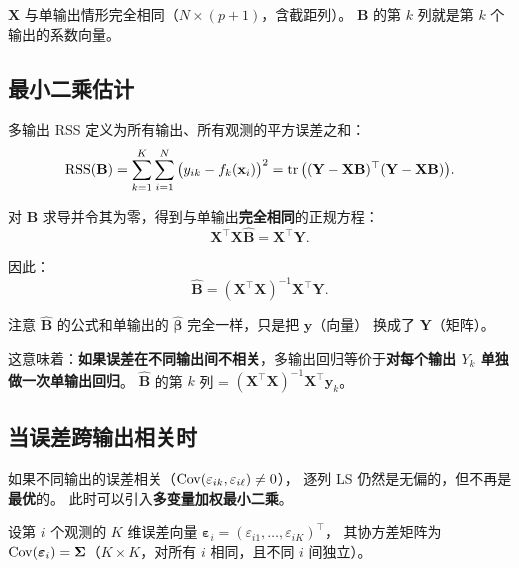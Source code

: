 $\mathbf{X}$ 与单输出情形完全相同（$N \times (p+1)$，含截距列）。
$\mathbf{B}$ 的第 $k$ 列就是第 $k$ 个输出的系数向量。

\subsection{最小二乘估计}

多输出 RSS 定义为所有输出、所有观测的平方误差之和：
\begin{equation}\label{eq:multi_RSS}
    \mathrm{RSS}(\mathbf{B})
    = \sum_{k=1}^{K} \sum_{i=1}^{N} \big(y_{ik} - f_k(\mathbf{x}_i)\big)^2
    = \operatorname{tr}\big((\mathbf{Y} - \mathbf{X}\mathbf{B})^\top (\mathbf{Y} - \mathbf{X}\mathbf{B})\big).
\end{equation}

对 $\mathbf{B}$ 求导并令其为零，得到与单输出\textbf{完全相同}的正规方程：
\begin{equation}\label{eq:multi_normal}
    \mathbf{X}^\top \mathbf{X} \hat{\mathbf{B}} = \mathbf{X}^\top \mathbf{Y}.
\end{equation}

因此：
\begin{equation}\label{eq:multi_B_hat}
    \boxed{\hat{\mathbf{B}} = (\mathbf{X}^\top \mathbf{X})^{-1} \mathbf{X}^\top \mathbf{Y}}.
\end{equation}

\begin{remark}
注意 $\hat{\mathbf{B}}$ 的公式和单输出的 $\hat{\bm{\beta}}$ 完全一样，只是把 $\mathbf{y}$（向量）
换成了 $\mathbf{Y}$（矩阵）。

这意味着：\textbf{如果误差在不同输出间不相关}，多输出回归等价于\textbf{对每个输出 $Y_k$ 单独做一次单输出回归}。
$\hat{\mathbf{B}}$ 的第 $k$ 列 = $(\mathbf{X}^\top \mathbf{X})^{-1} \mathbf{X}^\top \mathbf{y}_k$。
\end{remark}

\subsection{当误差跨输出相关时}

如果不同输出的误差相关（$\mathrm{Cov}(\varepsilon_{ik}, \varepsilon_{i\ell}) \neq 0$），
逐列 LS 仍然是无偏的，但不再是\textbf{最优}的。
此时可以引入\textbf{多变量加权最小二乘}。

\begin{definition}[误差协方差矩阵]
设第 $i$ 个观测的 $K$ 维误差向量 $\bm{\varepsilon}_i = (\varepsilon_{i1}, \dots, \varepsilon_{iK})^\top$，
其协方差矩阵为 $\mathrm{Cov}(\bm{\varepsilon}_i) = \bm{\Sigma}$（$K \times K$，对所有 $i$ 相同，且不同 $i$ 间独立）。
\end{definition}

